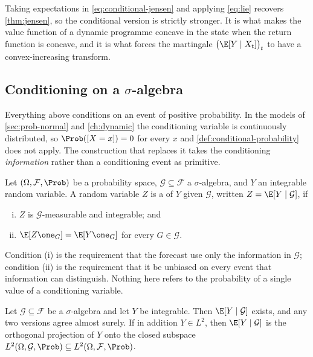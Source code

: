 Taking expectations in \eqref{eq:conditional-jensen} and applying
\eqref{eq:lie} recovers \autoref{thm:jensen}, so the conditional version is
strictly stronger. It is what makes the value function of a dynamic programme
concave in the state when the return function is concave, and it is what forces
the martingale $\bigl(\E[Y\mid X_t]\bigr)_t$ to have a convex-increasing
transform.

\subsection{Conditioning on a \texorpdfstring{$\sigma$}{sigma}-algebra}
\label{subsec:prob-general-conditioning}

Everything above conditions on an event of positive probability. In the models of
\autoref{sec:prob-normal} and \autoref{ch:dynamic} the conditioning variable is
continuously distributed, so $\Prob([X=x])=0$ for every $x$ and
\autoref{def:conditional-probability} does not apply. The construction that
replaces it takes the conditioning \emph{information} rather than a conditioning
event as primitive.

\begin{definition}
	\label{def:conditional-expectation-sigma}
	Let $(\Omega,\mathcal{F},\Prob)$ be a probability space, $\mathcal{G}\subseteq\mathcal{F}$ a
	$\sigma$-algebra, and $Y$ an integrable random variable. A random variable $Z$
	is a  of $Y$ given $\mathcal{G}$, written $Z=\E[Y\mid\mathcal{G}]$, if
	\begin{enumerate}[(i)]
		\item $Z$ is $\mathcal{G}$-measurable and integrable; and
		\item $\E[Z\one_G]=\E[Y\one_G]$ for every $G\in\mathcal{G}$.
	\end{enumerate}
\end{definition}

Condition (i) is the requirement that the forecast use only the information in
$\mathcal{G}$; condition (ii) is the requirement that it be unbiased on every event that
information can distinguish. Nothing here refers to the probability of a single
value of a conditioning variable.

\begin{theorem}\label{thm:cond-exp-exists}
	Let $\mathcal{G}\subseteq\mathcal{F}$ be a $\sigma$-algebra and let $Y$ be integrable. Then
	$\E[Y\mid\mathcal{G}]$ exists, and any two versions agree almost surely. If in addition
	$Y\in L^{2}$, then $\E[Y\mid\mathcal{G}]$ is the orthogonal projection of $Y$ onto the
	closed subspace $L^{2}(\Omega,\mathcal{G},\Prob)\subseteq L^{2}(\Omega,\mathcal{F},\Prob)$.
\end{theorem}

